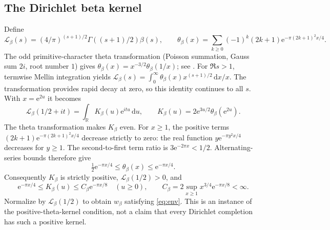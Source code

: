 \documentclass[11pt]{article}
\theoremstyle{remark}\newtheorem{remark}[theorem]{Remark}
\newcommand{\R}{\mathbb R}
\newcommand{\e}{\mathrm e}
\newcommand{\dd}{\,\mathrm d}
\begin{document}
\subsection{The Dirichlet beta kernel}
Define
\[
 \mathcal L_\beta(s)=(4/\pi)^{(s+1)/2}\Gamma((s+1)/2)\beta(s),\qquad
 \theta_\beta(x)=\sum_{k\ge0}(-1)^k(2k+1)\e^{-\pi(2k+1)^2x/4}.
\]
The odd primitive-character theta transformation (Poisson summation, Gauss sum $2i$, root number $1$) gives $\theta_\beta(x)=x^{-3/2}\theta_\beta(1/x)$; see \cite{kedlaya}. For $\Re s>1$, termwise Mellin integration yields $\mathcal L_\beta(s)=\int_0^\infty \theta_\beta(x)x^{(s+1)/2}\dd x/x$. The transformation provides rapid decay at zero, so this identity continues to all $s$. With $x=\e^{2u}$ it becomes
\[
 \mathcal L_\beta(1/2+it)=\int_{\R}K_\beta(u)\e^{itu}\dd u,
 \qquad K_\beta(u)=2\e^{3u/2}\theta_\beta(\e^{2u}).
\]
The theta transformation makes $K_\beta$ even. For $x\ge1$, the positive terms $(2k+1)\e^{-\pi(2k+1)^2x/4}$ decrease strictly to zero: the real function $y\e^{-\pi y^2x/4}$ decreases for $y\ge1$. The second-to-first term ratio is $3\e^{-2\pi x}<1/2$. Alternating-series bounds therefore give
\[
 \tfrac12\e^{-\pi x/4}\le\theta_\beta(x)\le\e^{-\pi x/4}.
\]
Consequently $K_\beta$ is strictly positive, $\mathcal L_\beta(1/2)>0$, and
\[
 \e^{-\pi x/4}\le K_\beta(u)\le C_\beta\e^{-\pi x/8}\quad(u\ge0),
 \qquad C_\beta=2\sup_{x\ge1}x^{3/4}\e^{-\pi x/8}<\infty.
\]
Normalize by $\mathcal L_\beta(1/2)$ to obtain $w_\beta$ satisfying \eqref{eq:env}. This is an instance of the positive-theta-kernel condition, not a claim that every Dirichlet completion has such a positive kernel.
\end{document}
